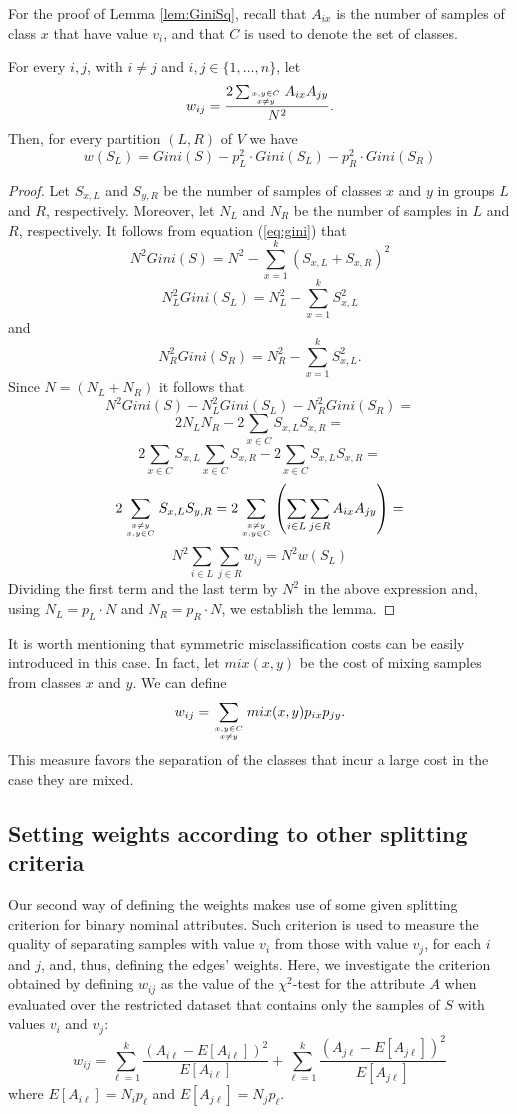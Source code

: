 For the proof of Lemma \ref{lem:GiniSq}, recall that $A_{ix}$ is the number
of samples of  class $x$ that have value $v_i$, and that $C$ is used to denote the set of classes.


\begin{lemma}
For every $i,j$, with $i \ne j$ and $i,j \in \{1,\ldots,n\}$,  let
$$ w_{ij} = \frac{ 2 \sum_{ x,y \in C \atop x \ne y }  A_{ix} A_{jy} }{ N^2}.$$
Then, for every partition $(L,R)$ of  $V$ we have
$$w(S_L)=Gini(S) - p^2_L \cdot Gini(S_L) - p^2_R \cdot Gini(S_R)$$
\label{lem:GiniSq}
\end{lemma}

\begin{proof}
Let $S_{x,L}$ and $S_{y,R}$  be the number of samples of classes $x$ and $y$ in groups $L$
and $R$, respectively. Moreover, let  $N_L$ and $N_R$ be 
the number of samples in $L$ and $R$, respectively.
It follows from equation (\ref{eq:gini}) that
$$N^2 Gini(S)=  N^2 -  \sum_{x=1}^k (S_{x,L} + S_{x,R})^2 $$
$$N_L^2 Gini(S_L)=  N_L^2 - \sum_{x=1}^k S_{x,L}^2 $$
and
$$N_R^2 Gini(S_R)= N_R^2 - \sum_{x=1}^k S_{x,L}^2. $$ 
Since $N=(N_L+N_R)$ it follows that 
$$N^2 Gini(S) - N_L^2 Gini(S_L)  - N_R^2 Gini(S_R) =$$
$$ 2 N_L N_R - 2 \sum_{x \in C} S_{x,L} S_{x,R} = $$
$$ 2  \sum_{x \in C } S_{x,L} \sum_{x \in C} S_{x,R}  - 2 \sum_{x \in C} S_{x,L} S_{x,R} =$$  
$$ 2  \sum_{ x \neq y \atop x,y \in C } S_{x,L} S_{y,R} =  2 \sum_{ x \neq y \atop x,y \in C } \left ( \sum_{ i \in L   }\sum_{ j \in R   }  A_{ix}A_{jy} \right ) =$$
$$ N^2 \sum_{i \in L  } \sum_{j \in R  } w_{ij} =  N^2 w(S_L) $$
Dividing the first term and the last term by $N^2$ in the  above expression and, using
 $N_L=p_L \cdot N$ and $N_R=p_R \cdot N$,
we  establish 
the lemma.
\end{proof}


It is worth mentioning that symmetric 
misclassification costs can be easily introduced in this case.
In fact, let $mix(x,y)$  be the cost 	
of  mixing  samples from classes $x$ and $y$.
We can define 
$$ w_{ij} =   \sum_{ x,y \in C \atop x \ne y } mix(x,y)  p_{ix} p_{jy} .$$
This measure favors the separation of the classes
that incur  a large cost in the case they are mixed.


\subsection{Setting weights according to other splitting criteria}

Our second way of defining the weights makes use of some 
given splitting criterion 
for  binary nominal attributes. 
Such  criterion is used to measure the quality of separating samples with value $v_i$ from those with value $v_j$,
for each $i$ and $j$, and, thus, defining the edges' weights.
Here, we investigate the criterion obtained by 
defining $w_{ij}$ as the value of the $\chi^2$-test
for the attribute $A$ when  evaluated over the restricted dataset 
that contains only the samples of $S$ with values $v_i$ and $v_j$:
$$w_{ij}=  \sum_{\ell=1}^k \frac{(A_{i \ell}-E[A_{i \ell}] )^2}{E[A_{ i \ell}]}
+ \sum_{\ell=1}^k \frac{(A_{j \ell}-E[A_{j \ell}] )^2}{E[A_{ j \ell}]}
$$
where $E[A_{i \ell }]=N_i p_{\ell}$
and $E[A_{j \ell }]=N_j p_{\ell} $.


